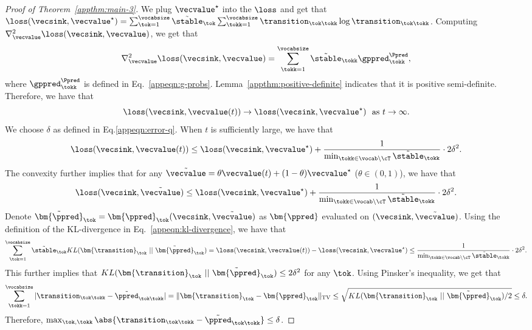 \begin{proof}[Proof of  Theorem~\ref{appthm:main-3}]
We plug $\vecvalue^\star$ into the $\loss$ and get that $\loss(\vecsink, \vecvalue^\star) = \sum_{\tok=1}^\vocabsize \Tilde{\stable}_{\tok} \sum_{\tokk=1}^\vocabsize \transition_{\tok\tokk} \log \transition_{\tok\tokk} $. Computing $\nabla^2_{\vecvalue} \loss(\vecsink,\vecvalue)$, we get that
\begin{equation*}
\nabla^2_{\vecvalue} \loss(\vecsink,\vecvalue) = \sum_{\tokk=1}^\vocabsize \Tilde{\stable}_\tokk \gppred^\Ppred_\tokk,
\end{equation*}
where $\gppred^\Ppred_\tokk$ is defined in Eq.~\eqref{appeqn:g-probs}.
Lemma~\ref{appthm:positive-definite} indicates that it is positive semi-definite. Therefore, we have that
\[
\loss(\vecsink, \vecvalue(t))\to \loss(\vecsink, \vecvalue^\star)~~\text{as }t\to \infty.
\]
We choose $\delta$ as defined in Eq.\eqref{appeqn:error-q}. When $t$ is sufficiently large, we have that
\[
\loss(\vecsink, \vecvalue(t))\leq \loss(\vecsink, \vecvalue^\star) + \frac{1}{\min_{\tokk\in\vocab\setminus\cT}\Tilde{\stable}_\tokk}\cdot 2 \delta^2. 
\]
The convexity further implies that for any $\Tilde{\vecvalue}=\theta \vecvalue(t) + (1-\theta)\vecvalue^\star$ ($\theta\in(0,1)$), we have that 
\[
\loss(\vecsink, \Tilde{\vecvalue})\leq \loss(\vecsink, \vecvalue^\star) + \frac{1}{\min_{\tokk\in\vocab\setminus\cT}\Tilde{\stable}_\tokk}\cdot 2 \delta^2. 
\]
Denote $\Tilde{\bm{\ppred}}_\tok={\bm{\ppred}}_\tok(\vecsink, \Tilde{\vecvalue})$ as $\bm{\ppred}$ evaluated on $(\vecsink,\Tilde{\vecvalue})$. Using the definition of the KL-divergence in Eq.~\eqref{appeqn:kl-divergence}, we have that
\[
\sum_{\tok=1}^\vocabsize \Tilde{\stable}_\tok KL(\bm{\transition}_\tok~||~\Tilde{\bm{\ppred}}_\tok) = \loss(\vecsink, \vecvalue(t))- \loss(\vecsink, \vecvalue^\star) \leq \frac{1}{\min_{\tokk\in\vocab\setminus\cT} \Tilde{\stable}_\tokk}\cdot 2 \delta^2.
\]
This further implies that $KL(\bm{\transition}_\tok~||~\Tilde{\bm{\ppred}}_\tok)\leq 2 \delta^2$ for any $\tok$. Using Pinsker's inequality, we get that
\[
\sum_{\tokk=1}^\vocabsize |\transition_{\tok\tokk}-\Tilde\ppred_{\tok\tokk}| = \| \bm{\transition}_\tok - \bm{\ppred}_\tok \|_{\text{TV}} \leq \sqrt{KL(\bm{\transition}_\tok~||~\Tilde{\bm{\ppred}}_\tok)/2} \leq \delta.
\]
Therefore, $\max_{\tok,\tokk}\abs{\transition_{\tok\tokk}-\Tilde\ppred_{\tok\tokk}}\leq \delta$. 

\end{proof}
